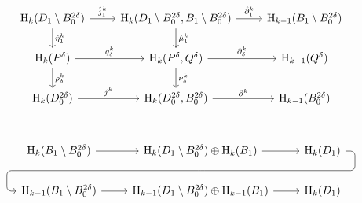 \begin{equation}\begin{tikzcd}
    \hom_k(D_1\setminus B_0^{2\delta})\arrow{r}{\hat{j}^k_1}\arrow{d}{\hat{\eta}^k_1} &
    \hom_k(D_1\setminus B_0^{2\delta}, B_1\setminus B_0^{2\delta})\arrow{r}{\hat{\partial}^k_1}\arrow{d}{\hat{\mu}^k_1} &
    \hom_{k-1}(B_1\setminus B_0^{2\delta})\\ %
    \hom_k(P^\delta)\arrow{r}{q^k_\delta} \arrow{d}{\rho^k_\delta} &
    \hom_k(P^\delta, Q^\delta)\arrow{r}{\partial^k_\delta} \arrow{d}{\nu^k_\delta} &
    \hom_{k-1}(Q^\delta)\\%
    \hom_k(D_0^{2\delta})\arrow{r}{j^k} & %
    \hom_k(D_0^{2\delta}, B_0^{2\delta})\arrow{r}{\partial^k} & %
    \hom_{k-1}(B_0^{2\delta}) \\ %
\end{tikzcd}\end{equation}

\begin{equation}\begin{tikzcd}
    \hom_k(B_1\setminus B_0^{2\delta})\arrow[r] &
    \hom_k(D_1\setminus B_0^{2\delta})\oplus\hom_k(B_1)\arrow[r]
        \arrow[d, phantom, ""{coordinate, name=Z}] &
    \hom_k(D_1)\arrow[dll, "", rounded corners,
              to path={ -- ([xshift=2ex]\tikztostart.east)
                        |- (Z) [near end]\tikztonodes
                        -| ([xshift=-2ex]\tikztotarget.west)
                        -- (\tikztotarget)}] \\
    \hom_{k-1}(B_1\setminus B_0^{2\delta})\arrow[r] &
    \hom_{k-1}(D_1\setminus B_0^{2\delta})\oplus\hom_{k-1}(B_1)\arrow[r] &
    \hom_k(D_1)
\end{tikzcd}\end{equation}

